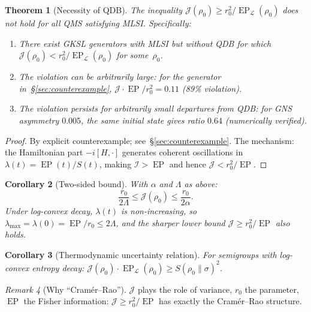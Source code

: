 \documentclass[11pt,a4paper]{article}
\newtheorem{theorem}{Theorem}[section]
\newtheorem{corollary}[theorem]{Corollary}
\theoremstyle{definition}
\theoremstyle{remark}
\newtheorem{remark}[theorem]{Remark}
\DeclareMathOperator{\EP}{EP}
\newcommand{\LL}{\mathcal{L}}
\begin{document}
\begin{theorem}[Necessity of QDB]\label{thm:necessity}
The inequality $\mathcal{J}(\rho_0) \ge r_0^2/\EP_\LL(\rho_0)$
does not hold for all QMS satisfying MLSI\@.  Specifically:
\begin{enumerate}[label=\textup{(\alph*)}]
  \item There exist GKSL generators with MLSI but without
  QDB for which
  $\mathcal{J}(\rho_0) < r_0^2/\EP_\LL(\rho_0)$
  for some~$\rho_0$.
  \item The violation can be arbitrarily large: for the generator
  in~\S\ref{sec:counterexample},
  $\mathcal{J}\cdot\EP/r_0^2 = 0.11$ (89\% violation).
  \item The violation persists for arbitrarily small departures from
  QDB: for GNS asymmetry $0.005$, the same initial state gives
  ratio $0.64$ (numerically verified).
\end{enumerate}
\end{theorem}

\begin{proof}
By explicit counterexample; see~\S\ref{sec:counterexample}.
The mechanism: the Hamiltonian part $-i[H,\cdot]$ generates coherent
oscillations in $\lambda(t) = \EP(t)/S(t)$, making
$\mathcal{I} > \EP$ and hence $\mathcal{J} < r_0^2/\EP$.
\end{proof}

\begin{corollary}[Two-sided bound]\label{cor:two-sided}
With $\alpha$ and $\Lambda$ as above:
\begin{equation}\label{eq:two-sided}
  \frac{r_0}{2\Lambda} \le \mathcal{J}(\rho_0) \le \frac{r_0}{2\alpha}.
\end{equation}
Under log-convex decay, $\lambda(t)$ is non-increasing, so
$\lambda_{\max} = \lambda(0) = \EP/r_0 \le 2\Lambda$, and the
sharper lower bound $\mathcal{J} \ge r_0^2/\EP$ also holds.
\end{corollary}

\begin{corollary}[Thermodynamic uncertainty relation]\label{cor:TUR}
For semigroups with log-convex entropy decay:
$\mathcal{J}(\rho_0)\cdot\EP_\LL(\rho_0) \ge S(\rho_0\|\sigma)^2$.
\end{corollary}

\begin{remark}[Why ``Cram\'er--Rao'']\label{rem:CR}
$\mathcal{J}$ plays the role of variance, $r_0$ the parameter,
$\EP$ the Fisher information:
$\mathcal{J} \ge r_0^2/\EP$ has exactly the Cram\'er--Rao structure.
\end{remark}
\end{document}
